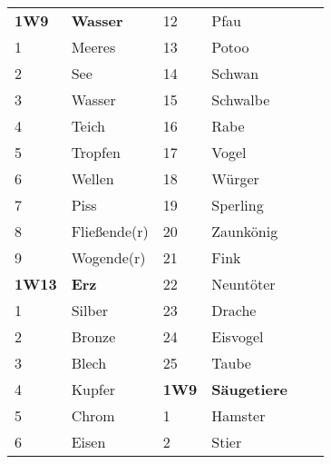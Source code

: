 \documentclass[final]{multiversum}
\begin{document}
\begin{table*}[!t]
\begin{framed}
\begin{tabular}{p{}p{}p{}p{}p{}p{}}
\textbf{1W9} & \textbf{Wasser}                 & 12              & Pfau                                        \\
1             & Meeres                         & 13              & Potoo                                       \\
2             & See                            & 14              & Schwan                                      \\
3             & Wasser                         & 15              & Schwalbe                                    \\
4             & Teich                          & 16              & Rabe                                        \\
5             & Tropfen                        & 17              & Vogel                                       \\
6             & Wellen                         & 18              & Würger                                      \\
7             & Piss                           & 19              & Sperling                                    \\
8             & Flie{\ss}ende(r)               & 20              & Zaunkönig                                   \\
9             & Wogende(r)                     & 21              & Fink                                        \\
\textbf{1W13} & \textbf{Erz}                   & 22              & Neuntöter                                   \\
1             & Silber                         & 23              & Drache                                      \\
2             & Bronze                         & 24              & Eisvogel                                    \\
3             & Blech                          & 25              & Taube                                       \\
4             & Kupfer                         & \textbf{1W9}    & \textbf{Säugetiere}                         \\
5             & Chrom             	           & 1               & Hamster                                     \\
6             & Eisen                          & 2               & Stier                                       \\

\end{tabular}
\end{framed}
\end{table*}
\end{document}
